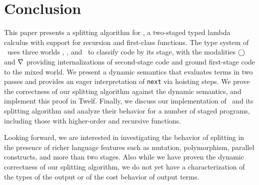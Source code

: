 
\section{Conclusion}

This paper presents a splitting algorithm for \lang, 
a two-staged typed lambda calculus with support for recursion and first-class functions.
The type system of \lang\ uses three worlds \bbonem, \bbonep, and \bbtwo\ to classify code by its stage,
with the modalities $\bigcirc$ and $\nabla$ providing internalizations 
of second-stage code and ground first-stage code to the mixed world.
We present a dynamic semantics that evaluates terms in two passes
and provides an eager interpretation of {\tt next} via hoisting steps.
We prove the correctness of our splitting algorithm against the dynamic semantics,
and implement this proof in Twelf.
Finally, we discuss our implementation of \lang\ and its splitting algorithm
and analyze their behavior for a number of staged programs,
including those with higher-order and recursive functions.

Looking forward, we are interested in investigating the behavior of splitting 
in the presence of richer language features such as mutation, polymorphism,
parallel constructs, and more than two stages.
Also while we have proven the dynamic correctness of our splitting algorithm,
we do not yet have a characterization of the types of the output
or of the cost behavior of output terms.
